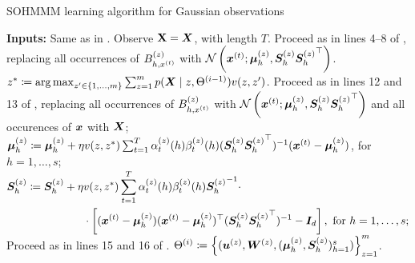 \begin{algorithm}
    \caption{SOHMMM learning algorithm for Gaussian observations}
    \label{alg:sohmmm_gaussian}

    \begin{algorithmic}[1]
        \State \textbf{Inputs:} Same as in .
        \vspace{0.3cm}
        \vspace{0.3cm}
        \State Observe ${\mathbf{X}} = {\bm{X}}$, with length $T$.
        \vspace{0.3cm}
        \State Proceed as in lines 4--8 of , replacing all occurrences of ${B}^{(z)}_{h,x^{(t)}}$ with $\mathcal{N}\left({\bm{x}}^{(t)}; {\bm{\mu}}^{(z)}_h, {\bm{S}}^{(z)}_h {{\bm{S}}^{(z)}_h}^\top\right)$.
        \vspace{0.3cm}
        \State $z^* \coloneqq  \operatorname*{arg\,max}_{z' \in \{1,\dots,m\}} \sum_{z=1}^m p({\bm{X}} \mid z, \Theta^{(i-1)})v(z, z')$.
        \vspace{0.3cm}
        \vspace{0.3cm}
        \State Proceed as in lines 12 and 13 of , replacing all occurrences of ${B}^{(z)}_{h,x^{(t)}}$ with $\mathcal{N}\left({\bm{x}}^{(t)}; {\bm{\mu}}^{(z)}_h, {\bm{S}}^{(z)}_h {{\bm{S}}^{(z)}_h}^\top\right)$ and all occurences of ${\bm{x}}$ with ${\bm{X}}$;
        \vspace{0.3cm}
        \State ${\bm{\mu}}^{(z)}_h \coloneqq {\bm{\mu}}^{(z)}_h + \eta v(z, z^*) \sum_{t=1}^T \alpha_{t}^{(z)}(h) \beta_{t}^{(z)}(h) ({\bm{S}}^{(z)}_h {{\bm{S}}^{(z)}_h} ^\top)^{-1} ({\bm{x}}^{(t)} - {\bm{\mu}}^{(z)}_h)$, for $h = 1, \dots, s$;
        \vspace{0.3cm}
        \State $\begin{aligned}
            {\bm{S}}^{(z)}_h \coloneqq {\bm{S}}^{(z)}_h + \eta &v(z, z^*) \sum_{t=1}^T \alpha_{t}^{(z)}(h) \beta_{t}^{(z)}(h) {{\bm{S}}^{(z)}_h}^{-1} \cdot \\
            &\cdot \left[ ({\bm{x}}^{(t)} - {\bm{\mu}}^{(z)}_h) ({\bm{x}}^{(t)} - {\bm{\mu}}^{(z)}_h)^\top ({\bm{S}}^{(z)}_h {{\bm{S}}^{(z)}_h} ^\top)^{-1} - {\bm{I}}_d\right],\text{ for }h = 1, \dots, s;
        \end{aligned}$
        \vspace{0.3cm}
        \State Proceed as in lines 15 and 16 of .
        \vspace{0.3cm}
        \EndFor
        \vspace{0.3cm}
        \State $\Theta^{(i)} \coloneqq \left\lbrace ({\bm{u}}^{(z)}, {\bm{W}}^{(z)}, ({\bm{\mu}}^{(z)}_h, {\bm{S}}^{(z)}_h)_{h=1}^s) \right\rbrace_{z=1}^m$.
        \vspace{0.3cm}
        \EndFor

    \end{algorithmic}
\end{algorithm}

